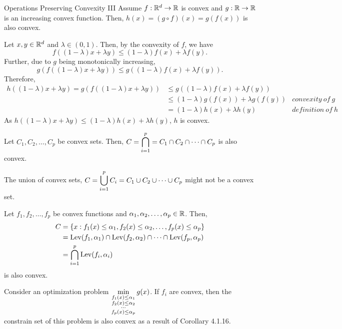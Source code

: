 \begin{thm}{Operations Preserving Convexity III}
	Assume $f:{\mathbb{R}}^d\to{\mathbb{R}}$ is convex and $g:{\mathbb{R}}\to{\mathbb{R}}$ is an increasing convex function. Then, $h(x)=(g\circ f)(x)=g(f(x))$ is also convex.
\end{thm}
\begin{prf}
	Let $x,y\in{\mathbb{R}}^d$ and $\lambda\in(0,1)$. Then, by the convexity of $f$, we have \[f((1-\lambda)x+\lambda y)\leq(1-\lambda)f(x)+\lambda f(y).\] Further, due to $g$ being monotonically increasing, \[g(f((1-\lambda)x+\lambda y))\leq g((1-\lambda)f(x)+\lambda f(y)).\] Therefore, \begin{align*}h((1-\lambda)x+\lambda y)=g(f((1-\lambda)x+\lambda y))&\leq g((1-\lambda)f(x)+\lambda f(y))\\&\leq (1-\lambda)g(f(x))+\lambda g(f(y))&convexity\ of\ g\\&=(1-\lambda)h(x)+\lambda h(y)& definition\ of\ h\end{align*} As $h((1-\lambda)x+\lambda y)\leq(1-\lambda)h(x)+\lambda h(y)$, $h$ is convex.
\end{prf}
\begin{clm}
	Let $C_1,C_2,\dots,C_p$ be convex sets. Then, $C=\displaystyle\bigcap_{i=1}^p=C_1\cap C_2\cap\cdots\cap C_p$ is also convex. 
\end{clm}
\begin{rmk}
	The union of convex sets, $C=\displaystyle\bigcup_{i=1}^pC_i=C_1\cup C_2\cup\cdots\cup C_p$	might not be a convex set. 
\end{rmk}
\begin{cor}{}
	Let $f_1,f_2,\dots,f_p$ be convex functions and $\alpha_1,\alpha_2,\dots,\alpha_p\in{\mathbb{R}}$. Then, \begin{align*}C&=\qty{x:f_1(x)\leq\alpha_1,f_2(x)\leq\alpha_2,\dots,f_p(x)\leq\alpha_p}\\&=\operatorname{Lev}(f_1,\alpha_1)\cap\operatorname{Lev}(f_2,\alpha_2)\cap\cdots\cap\operatorname{Lev}(f_p,\alpha_p)\\&=\bigcap_{i=1}^p\operatorname{Lev}(f_i,\alpha_i)\end{align*} is also convex.
\end{cor}
\begin{rmk}
	Consider an optimization problem $\displaystyle\min_{\substack{f_1(x)\leq\alpha_1\\f_2(x)\leq\alpha_2\\\cdots\\f_p(x)\leq\alpha_p}}g(x)$. If $f_i$ are convex, then the constrain set of this problem is also convex as a result of Corollary 4.1.16.
\end{rmk}




